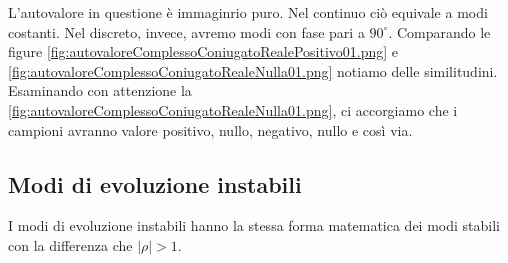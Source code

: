 \documentclass[a4paper]{report}
\begin{document}
L'autovalore in questione \`e immaginrio puro. Nel continuo
ci\`o equivale a modi costanti. Nel discreto, invece, avremo
modi con fase pari a $90^{\circ}$. Comparando le figure
\ref{fig:autovaloreComplessoConiugatoRealePositivo01.png} e
\ref{fig:autovaloreComplessoConiugatoRealeNulla01.png} notiamo
delle similitudini. Esaminando con attenzione la
\ref{fig:autovaloreComplessoConiugatoRealeNulla01.png}, ci
accorgiamo che i campioni avranno valore positivo, nullo,
negativo, nullo e cos\`i via.

\subsection{Modi di evoluzione instabili}
I modi di evoluzione instabili hanno la stessa forma matematica dei
modi stabili con la differenza che $|\rho| > 1$.
\end{document}
